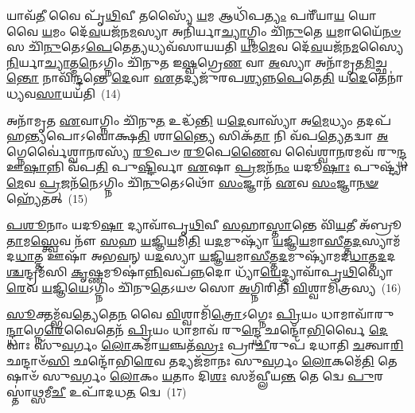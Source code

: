 {}%

𑌯𑌾𑌵᳴\-\ul{𑌤𑍀} 𑌵𑍈 𑌪𑍃᳴\-\ul{𑌥𑌿}\-𑌵𑍀 𑌤𑌸𑍍𑌯𑍈᳴ \ul{𑌯}\-𑌮 𑌆𑌧𑌿᳴𑌪\-\ul{𑌤𑍍𑌯𑌂} 𑌪𑌰𑍀᳴𑌯𑌾\-\ul{𑌯} 𑌯𑍋 𑌵𑍈 \ul{𑌯}\-𑌮𑌂 𑌦𑍇᳴\-\ul{𑌵}\-𑌯𑌜᳴𑌨\-\ul{𑌮}\-𑌸𑍍𑌯𑌾 𑌅𑌨𑌿᳴𑌰𑍍𑌯𑌾\-\ul{𑌚𑍍𑌯𑌾}\-𑌗𑍍𑌨𑌿𑌂 𑌚𑌿᳴\-\ul{𑌨𑍁}\-𑌤𑍇 \ul{𑌯}\-𑌮𑌾𑌯𑍈᳴\-\ul{𑌨}\-\-\ul{𑍞} 𑌸 𑌚𑌿᳴\-\ul{𑌨𑍁}\-𑌤𑍇\-𑌽\-\ul{𑌪𑍇}\-𑌤𑍇\-\ul{𑌤𑍍𑌯}\-𑌧𑍍𑌯𑌵᳴𑌸𑌾𑌯𑌯𑌤𑌿 \ul{𑌯}\-𑌮\-\ul{𑌮𑍇}\-𑌵 𑌦𑍇᳴\-\ul{𑌵}\-𑌯𑌜᳴𑌨\-\ul{𑌮}\-𑌸𑍍𑌯𑍈 \ul{𑌨𑌿}\-𑌰𑍍𑌯𑌾\-\ul{𑌚𑍍𑌯𑌾}\-𑌤𑍍𑌮\-\ul{𑌨𑍇}\-\-𑌽𑌗𑍍𑌨𑌿𑌂 𑌚𑌿᳴𑌨𑍁𑌤 𑌇\-\ul{𑌷𑍍𑌵}\-𑌗𑍍𑌰𑍇\-\ul{𑌣} 𑌵𑌾 \ul{𑌅}\-𑌸𑍍𑌯𑌾 𑌅𑌨𑌾᳴𑌮𑍃𑌤\-\ul{𑌮𑌿}\-𑌚𑍍𑌛\-\ul{𑌨𑍍𑌤𑍋} 𑌨𑌾𑌵𑌿᳴\-\ul{𑌨𑍍𑌦}\-𑌨𑍍𑌤𑍇 \ul{𑌦𑍇}\-𑌵𑌾 \ul{𑌏}\-𑌤𑌦𑍍𑌯𑌜𑍁᳴𑌰𑌪\-\ul{𑌶𑍍𑌯}\-𑌨𑍍𑌨\-\ul{𑌪𑍇}\-𑌤𑍇\-\ul{𑌤𑌿} 𑌯\-\ul{𑌦𑍇}\-𑌤𑍇𑌨𑌾॑𑌧𑍍𑌯𑌵\-\ul{𑌸𑌾}\-𑌯𑌯᳴𑌤𑌿~(14)

𑌅𑌨𑌾᳴𑌮𑍃𑌤 \ul{𑌏}\-𑌵𑌾𑌗𑍍𑌨𑌿𑌂 𑌚𑌿᳴𑌨𑍁\-\ul{𑌤} 𑌉𑌦𑍍𑌧᳴\-\ul{𑌨𑍍𑌤𑌿} 𑌯\-\ul{𑌦𑍇}\-𑌵𑌾𑌸𑍍𑌯𑌾᳴ 𑌅\-\ul{𑌮𑍇}\-𑌧𑍍𑌯𑌂 𑌤𑌦𑌪᳴ 𑌹\-\ul{𑌨𑍍𑌤𑍍𑌯}\-𑌪𑍋\-𑌽𑌵𑍋॑𑌕𑍍𑌷\-\ul{𑌤𑌿} 𑌶𑌾\-\ul{𑌨𑍍𑌤𑍍𑌯𑍈} 𑌸𑌿𑌕᳴\-\ul{𑌤𑌾} 𑌨𑌿 𑌵᳴𑌪\-\ul{𑌤𑍍𑌯𑍇}\-𑌤𑌦𑍍𑌵𑌾 \ul{𑌅}\-𑌗𑍍𑌨𑍇𑌰𑍍𑌵𑍈॑𑌶𑍍𑌵𑌾\-\ul{𑌨}\-𑌰𑌸𑍍𑌯᳴ \ul{𑌰𑍂}\-𑌪𑍞 \ul{𑌰𑍂}\-𑌪𑍇\-\ul{𑌣𑍈}\-𑌵 𑌵𑍈॑𑌶𑍍𑌵𑌾\-\ul{𑌨}\-𑌰𑌮𑌵᳴ 𑌰𑍁\-\ul{𑌨𑍍𑌦𑍍𑌧} 𑌊\-\ul{𑌷𑌾}\-𑌨𑍍𑌨𑌿 𑌵᳴𑌪\-\ul{𑌤𑌿} 𑌪𑍁\-\ul{𑌷𑍍𑌟𑌿}\-𑌰𑍍𑌵𑌾 \ul{𑌏}\-𑌷𑌾 \ul{𑌪𑍍𑌰}\-𑌜𑌨᳴\-\ul{𑌨𑌂} 𑌯𑌦𑍂\-\ul{𑌷𑌾𑌃} 𑌪𑍁𑌷𑍍𑌟𑍍𑌯𑌾᳴\-\ul{𑌮𑍇}\-𑌵 \ul{𑌪𑍍𑌰}\-𑌜𑌨᳴\-\ul{𑌨𑍇}\-\-𑌽𑌗𑍍𑌨𑌿𑌂 𑌚𑌿᳴\-\ul{𑌨𑍁}\-𑌤𑍇\-𑌽𑌥𑍋᳴ \ul{𑌸𑌂}\-𑌜𑍍𑌞𑌾𑌨᳴ \ul{𑌏}\-𑌵 \ul{𑌸𑌂}\-𑌜𑍍𑌞𑌾\-\ul{𑌨}\-\-\ul{𑍟} 𑌹𑍍𑌯𑍇᳴𑌤𑌤𑍍~(15)

\-\ul{𑌪}\-\-\ul{𑌶𑍂}\-𑌨𑌾𑌂 𑌯𑌦𑍂\-\ul{𑌷𑌾} 𑌦𑍍𑌯𑌾𑌵𑌾᳴𑌪𑍃\-\ul{𑌥𑌿}\-𑌵𑍀 \ul{𑌸}\-𑌹𑌾\-\ul{𑌸𑍍𑌤𑌾}\-𑌨𑍍𑌤𑍇 𑌵𑌿᳴\-\ul{𑌯}\-𑌤𑍀 𑌅᳴𑌬𑍍𑌰𑍂\-\ul{𑌤𑌾}\-𑌮\-\ul{𑌸𑍍𑌤𑍍𑌵𑍇}\-𑌵 𑌨𑍗᳴ \ul{𑌸}\-𑌹 \ul{𑌯}\-𑌜𑍍𑌞𑌿\-\ul{𑌯}\-𑌮𑌿\-\ul{𑌤𑌿} 𑌯\-\ul{𑌦}\-𑌮𑍁𑌷𑍍𑌯𑌾᳴ \ul{𑌯}\-𑌜𑍍𑌞𑌿\-\ul{𑌯}\-𑌮𑌾\-\ul{𑌸𑍀}\-𑌤𑍍𑌤\-\ul{𑌦}\-𑌸𑍍𑌯𑌾𑌮᳴𑌦\-\ul{𑌧𑌾}\-𑌤𑍍𑌤 𑌊𑌷𑌾᳴ 𑌅𑌭\-\ul{𑌵}\-𑌨𑍍 𑌯\-\ul{𑌦}\-𑌸𑍍𑌯𑌾 \ul{𑌯}\-𑌜𑍍𑌞𑌿\-\ul{𑌯}\-𑌮𑌾\-\ul{𑌸𑍀}\-𑌤𑍍𑌤\-\ul{𑌦}\-𑌮𑍁𑌷𑍍𑌯𑌾᳴𑌮𑌦\-\ul{𑌧𑌾}\-𑌤𑍍𑌤\-\ul{𑌦}\-𑌦\-\ul{𑌶𑍍𑌚}\-𑌨𑍍𑌦𑍍𑌰𑌮᳴𑌸𑌿 \ul{𑌕𑍃}\-𑌷𑍍𑌣𑌮𑍂𑌷𑌾॑\-\ul{𑌨𑍍𑌨𑌿}\-𑌵𑌪᳴\-\ul{𑌨𑍍𑌨}\-𑌦𑍋 𑌧𑍍𑌯𑌾᳴\-\ul{𑌯𑍇}\-𑌦𑍍𑌦𑍍𑌯𑌾𑌵𑌾᳴𑌪𑍃\-\ul{𑌥𑌿}\-𑌵𑍍𑌯𑍋\-\ul{𑌰𑍇}\-𑌵 \ul{𑌯}\-𑌜𑍍𑌞𑌿\-\ul{𑌯𑍇}\-\-𑌽𑌗𑍍𑌨𑌿𑌂 𑌚𑌿᳴𑌨𑍁\-\ul{𑌤𑍇}\-\-𑌽𑌯𑍞 𑌸𑍋 \ul{𑌅}\-𑌗𑍍𑌨𑌿𑌰𑌿𑌤𑌿᳴ \ul{𑌵𑌿}\-𑌶𑍍𑌵𑌾𑌮𑌿᳴𑌤𑍍𑌰𑌸𑍍𑌯~(16)

\-\ul{𑌸𑍂}\-𑌕𑍍𑌤𑌮𑍍𑌭᳴𑌵\-\ul{𑌤𑍍𑌯𑍇}\-𑌤𑍇\-\ul{𑌨} 𑌵𑍈 \ul{𑌵𑌿}\-𑌶𑍍𑌵𑌾𑌮𑌿᳴\-\ul{𑌤𑍍𑌰𑍋}\-\-𑌽𑌗𑍍𑌨𑍇𑌃 \ul{𑌪𑍍𑌰𑌿}\-𑌯𑌂 𑌧𑌾𑌮𑌾𑌵𑌾᳴𑌰𑍁\-\ul{𑌨𑍍𑌦𑍍𑌧𑌾}\-𑌗𑍍𑌨𑍇\-\ul{𑌰𑍇}\-𑌵𑍈𑌤𑍇𑌨᳴ \ul{𑌪𑍍𑌰𑌿}\-𑌯𑌂 𑌧𑌾𑌮𑌾𑌵᳴ 𑌰𑍁\-\ul{𑌨𑍍𑌦𑍍𑌧𑍇} 𑌛𑌨𑍍𑌦𑍋᳴\-\ul{𑌭𑌿}\-𑌰𑍍𑌵𑍈 \ul{𑌦𑍇}\-𑌵𑌾𑌃 𑌸𑍁᳴\-\ul{𑌵}\-𑌰𑍍𑌗𑌂 \ul{𑌲𑍋}\-𑌕𑌮𑌾᳴\-\ul{𑌯}\-𑌞𑍍𑌚𑌤᳴\-\ul{𑌸𑍍𑌰𑌃} 𑌪𑍍𑌰𑌾\-\ul{𑌚𑍀}\-𑌰𑍁𑌪᳴ 𑌦𑌧𑌾𑌤𑌿 \ul{𑌚}\-𑌤𑍍𑌵𑌾\-\ul{𑌰𑌿} 𑌛𑌨𑍍𑌦𑌾𑍞᳴\-\ul{𑌸𑌿} 𑌛𑌨𑍍𑌦𑍋᳴𑌭𑌿\-\ul{𑌰𑍇}\-𑌵 𑌤𑌦𑍍𑌯𑌜᳴𑌮𑌾𑌨𑌃 𑌸𑍁\-\ul{𑌵}\-𑌰𑍍𑌗𑌂 \ul{𑌲𑍋}\-𑌕𑌮𑍇᳴\-\ul{𑌤𑌿} 𑌤𑍇𑌷𑌾𑍞᳴ 𑌸𑍁\-\ul{𑌵}\-𑌰𑍍𑌗𑌂 \ul{𑌲𑍋}\-𑌕𑌂 \ul{𑌯}\-𑌤𑌾𑌂 𑌦𑌿\-\ul{𑌶𑌃} 𑌸𑌮᳴𑌵𑍍𑌲𑍀𑌯\-\ul{𑌨𑍍𑌤} 𑌤𑍇 𑌦𑍍𑌵𑍇 \ul{𑌪𑍁}\-𑌰𑌸𑍍𑌤𑌾॑\-\ul{𑌥𑍍𑌸}\-𑌮𑍀\-\ul{𑌚𑍀} 𑌉𑌪𑌾᳴𑌦𑌧\-\ul{𑌤} 𑌦𑍍𑌵𑍇~(17)

